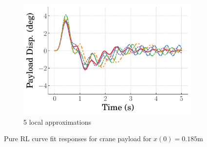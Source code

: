 \begin{figure}
\begin{subfigure}[b]{0.32\textwidth}
    \end{subfigure}
    \hfill
    \begin{subfigure}[b]{0.32\textwidth}
        \centering
        \includegraphics[width=\textwidth]{figures/figures_Interpretability/Mean_ISE_dpcrane_cubic_5_bins/curve_fit_time_responses/pure_RL/curve_fit_0p18_Payload_Disp.pdf} 
        \caption{5 local approximations}
        \label{subfig_chap5:dpcrane_pure_RL_payload_0.185_init_curve_fit_5_bins_unclipped}
    \end{subfigure}
    \hfill
    \caption{Pure RL curve fit responses for crane payload for $x(0)=0.185\si{\meter}$}
    \label{fig_chap5:dpcrane_pure_RL_payload_0.185_init_unclipped}
\end{figure}
%


